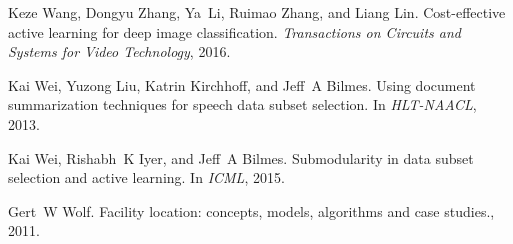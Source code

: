 \documentclass{article} %
\begin{document}
\begin{thebibliography}{40}
Keze Wang, Dongyu Zhang, Ya~Li, Ruimao Zhang, and Liang Lin.
\newblock Cost-effective active learning for deep image classification.
\newblock \emph{Transactions on Circuits and Systems for Video Technology},
  2016.

Kai Wei, Yuzong Liu, Katrin Kirchhoff, and Jeff~A Bilmes.
\newblock Using document summarization techniques for speech data subset
  selection.
\newblock In \emph{HLT-NAACL}, 2013.

Kai Wei, Rishabh~K Iyer, and Jeff~A Bilmes.
\newblock Submodularity in data subset selection and active learning.
\newblock In \emph{ICML}, 2015.

Gert~W Wolf.
\newblock Facility location: concepts, models, algorithms and case studies.,
  2011.

\end{thebibliography}

\appendix
\end{document}
